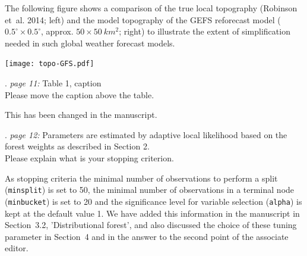 \documentclass[american,foldmarks=false,noconfig]{uibklttr}
\newenvironment{review}{\fontshape{\itdefault}\fontseries{\bfdefault} \selectfont \smallskip}{\par}
\begin{document}
The following figure shows a comparison of the true local topography
(Robinson et~al. 2014; left)
and the model topography of the GEFS reforecast model
($0.5^\circ \times 0.5^\circ$, approx. $50 \times 50~km^2$; right) to illustrate
the extent of simplification needed in such global weather forecast models.

\begin{center}
\texttt{[image: topo-GFS.pdf]}
\end{center}





\begin{review}
12. {\color{quotecolor}\textit{page 11:} Table 1, caption}\\
Please move the caption above the table.
\end{review}

This has been changed in the manuscript.

\begin{review}
13. {\color{quotecolor}\textit{page 12:} Parameters are estimated 
by adaptive local likelihood based on the forest weights as 
described in Section 2.}\\
Please explain what is your stopping criterion.
\end{review}

As stopping criteria the minimal number of observations to perform 
a split (\texttt{minsplit}) is set to 50, the minimal number of 
observations in a terminal node (\texttt{minbucket}) is set to 20 
and the significance level for variable selection (\texttt{alpha}) 
is kept at the default value 1. We have added this information in 
the manuscript in Section~3.2, 'Distributional forest', and
also discussed the choice of these tuning parameter in Section~4 and
in the answer to the second point of the associate editor.
\end{document}

